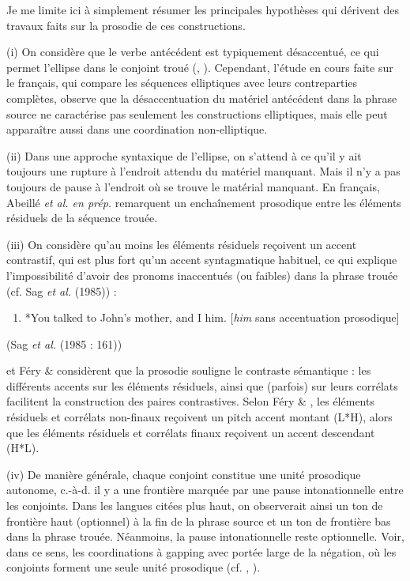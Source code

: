 Je me limite ici à simplement résumer les principales hypothèses qui dérivent des travaux faits sur la prosodie de ces constructions.  

(i) On considère que le verbe antécédent est typiquement désaccentué, ce qui permet l'ellipse dans le conjoint troué (\citet{Hartmann2000}, \citet{Schwarz2000}). Cependant, l'étude en cours faite sur le français, qui compare les séquences elliptiques avec leurs contreparties complètes, observe que la désaccentuation du matériel antécédent dans la phrase source ne caractérise pas seulement les constructions elliptiques, mais elle peut apparaître aussi dans une coordination non-elliptique.  

(ii) Dans une approche syntaxique de l'ellipse, on s'attend à ce qu'il y ait toujours une rupture à l'endroit attendu du matériel manquant. Mais il n'y a pas toujours de pause à l'endroit où se trouve le matérial manquant. En français, Abeillé \textit{et al. en prép.} remarquent un enchaînement prosodique entre les éléments résiduels de la séquence trouée. 

(iii) On considère qu'au moins les éléments résiduels reçoivent un accent contrastif, qui est plus fort qu'un accent syntagmatique habituel, ce qui explique l'impossibilité d'avoir des pronoms inaccentués (ou faibles) dans la phrase trouée (cf. Sag \textit{et al.} (1985)) :


\begin{enumerate}
\item *You talked to John's mother, and I him.  [\textit{him} sans accentuation prosodique]


\end{enumerate}
{\raggedleft
 (Sag \textit{et al.} (1985 : 161))
}

\citet{Hartmann2000} et Féry \& \citet{Hartmann2005} considèrent que la prosodie souligne le contraste sémantique : les différents accents sur les éléments résiduels, ainsi que (parfois) sur leurs corrélats facilitent la construction des paires contrastives. Selon Féry \& \citet{Hartmann2005}, les éléments résiduels et corrélats non-finaux reçoivent un pitch accent montant (L*H), alors que les éléments résiduels et corrélats finaux reçoivent un accent descendant (H*L). 

(iv) De manière générale, chaque conjoint constitue une unité prosodique autonome, c.-à-d. il y a une frontière marquée par une pause intonationnelle entre les conjoints. Dans les langues citées plus haut, on observerait ainsi un ton de frontière haut (optionnel) à la fin de la phrase source et un ton de frontière bas dans la phrase trouée. Néanmoins, la pause intonationnelle reste optionnelle. Voir, dans ce sens, les coordinations à gapping avec portée large de la négation, où les conjoints forment une seule unité prosodique (cf. \citet{Oehrle1987}, \citet{Winkler2005}).

